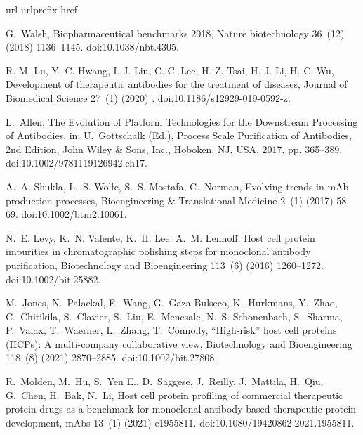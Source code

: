 \documentclass[preprint,review,12pt]{elsarticle}
\providecommand{\DIFaddtex}[1]{\protect\cbstart{#1}\protect\cbend} %
\providecommand{\DIFaddbegin}{} %
\providecommand{\DIFaddend}{} %
\providecommand{\DIFadd}[1]{\texorpdfstring{\DIFaddtex{#1}}{#1}} %
\begin{document}

\begin{thebibliography}{10}
\expandafter\ifx\csname url\endcsname\relax
  \def\url#1{\texttt{#1}}\fi
\expandafter\ifx\csname urlprefix\endcsname\relax\def\urlprefix{URL }\fi
\expandafter\ifx\csname href\endcsname\relax
  \def\href#1#2{#2} \def\path#1{#1}\fi

G.~Walsh, {Biopharmaceutical benchmarks 2018}, Nature biotechnology 36~(12)
  (2018) 1136--1145.
\newblock \href {https://doi.org/10.1038/nbt.4305}
  {\path{doi:10.1038/nbt.4305}}.

R.-M. Lu, Y.-C. Hwang, I.-J. Liu, C.-C. Lee, H.-Z. Tsai, H.-J. Li, H.-C. Wu,
  {Development of therapeutic antibodies for the treatment of diseases},
  Journal of Biomedical Science 27~(1) (2020) \DIFaddbegin \DIFadd{1--30}\DIFaddend .
\newblock \href {https://doi.org/10.1186/s12929-019-0592-z}
  {\path{doi:10.1186/s12929-019-0592-z}}.

L.~Allen, {The Evolution of Platform Technologies for the Downstream Processing
  of Antibodies}, in: U.~Gottschalk (Ed.), Process Scale Purification of
  Antibodies, 2nd Edition, John Wiley \& Sons, Inc., Hoboken, NJ, USA, 2017,
  pp. 365--389.
\newblock \href {https://doi.org/10.1002/9781119126942.ch17}
  {\path{doi:10.1002/9781119126942.ch17}}.

A.~A. Shukla, L.~S. Wolfe, S.~S. Mostafa, C.~Norman, {Evolving trends in mAb
  production processes}, Bioengineering \& Translational Medicine 2~(1) (2017)
  58--69.
\newblock \href {https://doi.org/10.1002/btm2.10061}
  {\path{doi:10.1002/btm2.10061}}.

N.~E. Levy, K.~N. Valente, K.~H. Lee, A.~M. Lenhoff, {Host cell protein
  impurities in chromatographic polishing steps for monoclonal antibody
  purification}, Biotechnology and Bioengineering 113~(6) (2016) 1260--1272.
\newblock \href {https://doi.org/10.1002/bit.25882}
  {\path{doi:10.1002/bit.25882}}.

M.~Jones, N.~Palackal, F.~Wang, G.~Gaza-Bulseco, K.~Hurkmans, Y.~Zhao,
  C.~Chitikila, S.~Clavier, S.~Liu, E.~Menesale, N.~S. Schonenbach, S.~Sharma,
  P.~Valax, T.~Waerner, L.~Zhang, T.~Connolly, {“High-risk” host cell
  proteins (HCPs): A multi-company collaborative view}, Biotechnology and
  Bioengineering 118~(8) (2021) 2870--2885.
\newblock \href {https://doi.org/10.1002/bit.27808}
  {\path{doi:10.1002/bit.27808}}.

R.~Molden, M.~Hu, S.~{Yen E.}, D.~Saggese, J.~Reilly, J.~Mattila, H.~Qiu,
  G.~Chen, H.~Bak, N.~Li, {Host cell protein profiling of commercial
  therapeutic protein drugs as a benchmark for monoclonal antibody-based
  therapeutic protein development}, mAbs 13~(1) (2021) e1955811.
\newblock \href {https://doi.org/10.1080/19420862.2021.1955811}
  {\path{doi:10.1080/19420862.2021.1955811}}.


\end{thebibliography}
\end{document}
